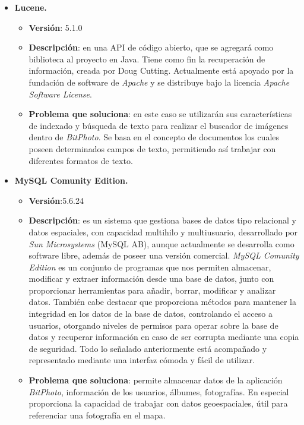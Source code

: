 \documentclass{memoria}
\begin{document}
\begin{itemize}
\item \textbf{Lucene.}
	\begin{itemize}
	\item \textbf{Versión}: 5.1.0
	\item \textbf{Descripción}: en una API de código abierto, que se agregará como biblioteca al proyecto en Java. Tiene como fin la recuperación de información, creada por Doug Cutting. Actualmente está apoyado por la fundación de software de \textsl{Apache} y se distribuye bajo la licencia \textsl{Apache Software License}.
	\item \textbf{Problema que soluciona}: en este caso se utilizarán sus características de indexado y búsqueda de texto para realizar el buscador de imágenes dentro de \textsl{BitPhoto}. Se basa en el concepto de documentos los cuales poseen determinados campos de texto, permitiendo así trabajar con diferentes formatos de texto.
	\end{itemize}
	
\item \textbf{MySQL Comunity Edition.}
	\begin{itemize}
	\item \textbf{Versión}:5.6.24
	\item \textbf{Descripción}: es un sistema que gestiona bases de datos tipo relacional y datos espaciales, con capacidad multihilo y multiusuario, desarrollado por \textsl{Sun Microsystems} (MySQL AB), aunque actualmente se desarrolla como software libre, además de poseer una versión comercial. \textsl{MySQL Comunity Edition} es un conjunto de programas que nos permiten almacenar, modificar y extraer información desde una base de datos, junto con proporcionar herramientas para añadir, borrar, modificar y analizar datos. También cabe destacar que proporciona métodos para mantener la integridad en los datos de la base de datos, controlando el acceso a usuarios, otorgando niveles de permisos para operar sobre la base de datos y recuperar información en caso de ser corrupta mediante una copia de seguridad. Todo lo señalado anteriormente está acompañado y representado mediante una interfaz cómoda y fácil de utilizar.
	\item \textbf{Problema que soluciona}: permite almacenar datos de la aplicación \textsl{BitPhoto}, información de los usuarios, álbumes, fotografías. En especial proporciona la capacidad de trabajar con datos geoespaciales, útil para referenciar una fotografía en el mapa.
	\end{itemize}
	

\end{itemize}
\end{document}
